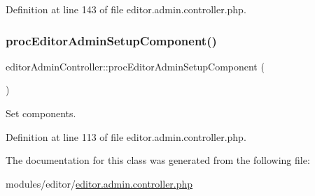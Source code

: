 Definition at line 143 of file editor.\+admin.\+controller.\+php.

\mbox{\label{classeditorAdminController_a42b74f6454a6b5f75a2029c13452e0b8}} 
\subsubsection{\texorpdfstring{proc\+Editor\+Admin\+Setup\+Component()}{procEditorAdminSetupComponent()}}
{\footnotesize\ttfamily editor\+Admin\+Controller\+::proc\+Editor\+Admin\+Setup\+Component (\begin{DoxyParamCaption}{ }\end{DoxyParamCaption})}



Set components. 



Definition at line 113 of file editor.\+admin.\+controller.\+php.



The documentation for this class was generated from the following file\+:\begin{DoxyCompactItemize}
\item 
modules/editor/\hyperlink{editor_8admin_8controller_8php}{editor.\+admin.\+controller.\+php}\end{DoxyCompactItemize}
